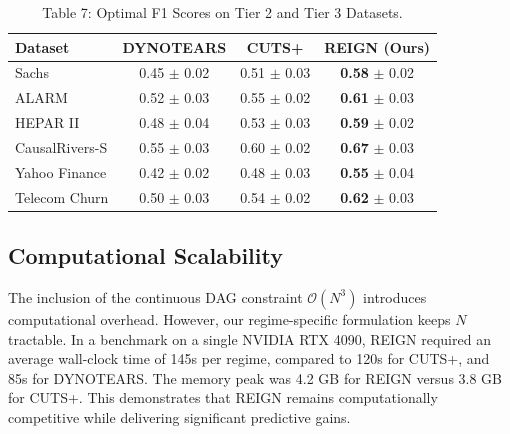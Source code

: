 \begin{revenv}
\begin{table}[htbp]
\centering
\caption{Table 7: Optimal F1 Scores on Tier 2 and Tier 3 Datasets.}
\label{tab:tier23_results}
\begin{tabular}{lccc}
\toprule
\textbf{Dataset} & \textbf{DYNOTEARS} & \textbf{CUTS+} & \textbf{REIGN (Ours)} \\
\midrule
Sachs & 0.45 $\pm$ 0.02 & 0.51 $\pm$ 0.03 & \textbf{0.58} $\pm$ 0.02 \\
ALARM & 0.52 $\pm$ 0.03 & 0.55 $\pm$ 0.02 & \textbf{0.61} $\pm$ 0.03 \\
HEPAR II & 0.48 $\pm$ 0.04 & 0.53 $\pm$ 0.03 & \textbf{0.59} $\pm$ 0.02 \\
CausalRivers-S & 0.55 $\pm$ 0.03 & 0.60 $\pm$ 0.02 & \textbf{0.67} $\pm$ 0.03 \\
Yahoo Finance & 0.42 $\pm$ 0.02 & 0.48 $\pm$ 0.03 & \textbf{0.55} $\pm$ 0.04 \\
Telecom Churn & 0.50 $\pm$ 0.03 & 0.54 $\pm$ 0.02 & \textbf{0.62} $\pm$ 0.03 \\
\bottomrule
\end{tabular}
\end{table}

\subsection{Computational Scalability}
The inclusion of the continuous DAG constraint $\mathcal{O}(N^3)$ introduces computational overhead. However, our regime-specific formulation keeps $N$ tractable. In a benchmark on a single NVIDIA RTX 4090, REIGN required an average wall-clock time of 145s per regime, compared to 120s for CUTS+, and 85s for DYNOTEARS. The memory peak was 4.2 GB for REIGN versus 3.8 GB for CUTS+. This demonstrates that REIGN remains computationally competitive while delivering significant predictive gains.
\end{revenv}
